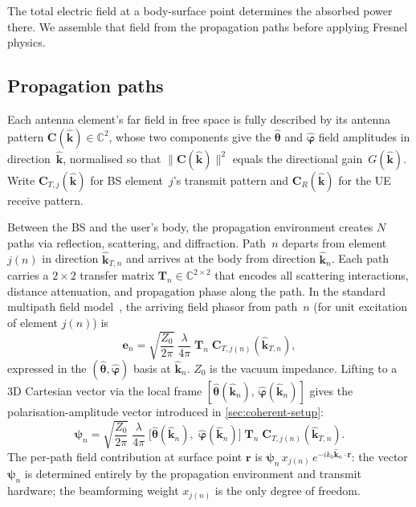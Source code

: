 \documentclass[11pt,a4paper]{article}
\theoremstyle{definition}      %
\newcommand{\khat}{\hat{\bm{k}}}
\begin{document}
The total electric field at a body-surface point determines the
absorbed power there.  We assemble that field from the propagation
paths before applying Fresnel physics.

\subsection{Propagation paths}\label{sec:antenna-paths}

Each antenna element's far field in free space is fully described by
its antenna pattern $\mathbf{C}(\khat) \in \mathbb{C}^2$,
whose two components give the $\hat{\boldsymbol{\theta}}$ and
$\hat{\boldsymbol{\varphi}}$ field amplitudes in direction~$\khat$,
normalised so that $\|\mathbf{C}(\khat)\|^2$ equals the directional
gain~$G(\khat)$.  Write $\mathbf{C}_{T,j}(\khat)$ for BS
element~$j$'s transmit pattern and $\mathbf{C}_R(\khat)$ for the UE
receive pattern.

Between the BS and the user's body, the propagation environment
creates $N$ paths via reflection, scattering, and diffraction.
Path~$n$ departs from element $j(n)$ in direction
$\hat{\mathbf{k}}_{T,n}$ and arrives at the body from direction
$\hat{\mathbf{k}}_n$.  Each path carries a $2\times 2$ transfer
matrix $\mathbf{T}_n \in \mathbb{C}^{2\times 2}$ that encodes all
scattering interactions, distance attenuation, and propagation phase
along the path.  In the standard multipath field
model~\cite{SionnaEM}, the arriving field phasor from path~$n$ (for
unit excitation of element $j(n)$) is
\begin{equation}\label{eq:e-n-phasor}
  \mathbf{e}_n = \sqrt{\frac{Z_0}{2\pi}}\;\frac{\lambda}{4\pi}\;
  \mathbf{T}_n\;\mathbf{C}_{T,j(n)}(\hat{\mathbf{k}}_{T,n}),
\end{equation}
expressed in the
$(\hat{\boldsymbol{\theta}},\hat{\boldsymbol{\varphi}})$ basis at
$\hat{\mathbf{k}}_n$. $Z_0$ is the vacuum impedance. Lifting to a 3D Cartesian vector via the
local frame
$[\hat{\boldsymbol{\theta}}(\hat{\mathbf{k}}_n),\,
\hat{\boldsymbol{\varphi}}(\hat{\mathbf{k}}_n)]$ gives the
polarisation-amplitude vector introduced in
\cref{sec:coherent-setup}:
\begin{equation}\label{eq:psi-def}
  \boldsymbol{\psi}_n = \sqrt{\frac{Z_0}{2\pi}}\;\frac{\lambda}{4\pi}\;
  \bigl[\hat{\boldsymbol{\theta}}(\hat{\mathbf{k}}_n),\;
  \hat{\boldsymbol{\varphi}}(\hat{\mathbf{k}}_n)\bigr]\;
  \mathbf{T}_n\;\mathbf{C}_{T,j(n)}(\hat{\mathbf{k}}_{T,n}).
\end{equation}
The per-path field contribution at surface point $\mathbf{r}$ is
$\boldsymbol{\psi}_n\,x_{j(n)}\,e^{-ik_0\hat{\mathbf{k}}_n\cdot\mathbf{r}}$:
the vector $\boldsymbol{\psi}_n$ is determined entirely by the
propagation environment and transmit hardware; the beamforming
weight $x_{j(n)}$ is the only degree of freedom.
\end{document}

